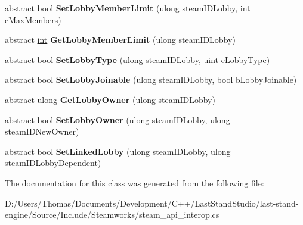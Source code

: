 \begin{DoxyCompactItemize}
\item 
\hypertarget{classValve_1_1Steamworks_1_1ISteamMatchmaking_a0256112144a894e1fb29af8934ae7090}{}abstract bool {\bfseries Set\+Lobby\+Member\+Limit} (ulong steam\+I\+D\+Lobby, \hyperlink{SDL__thread_8h_a6a64f9be4433e4de6e2f2f548cf3c08e}{int} c\+Max\+Members)\label{classValve_1_1Steamworks_1_1ISteamMatchmaking_a0256112144a894e1fb29af8934ae7090}

\item 
\hypertarget{classValve_1_1Steamworks_1_1ISteamMatchmaking_a49689e5ad1af7d6e264982d9c3dcb174}{}abstract \hyperlink{SDL__thread_8h_a6a64f9be4433e4de6e2f2f548cf3c08e}{int} {\bfseries Get\+Lobby\+Member\+Limit} (ulong steam\+I\+D\+Lobby)\label{classValve_1_1Steamworks_1_1ISteamMatchmaking_a49689e5ad1af7d6e264982d9c3dcb174}

\item 
\hypertarget{classValve_1_1Steamworks_1_1ISteamMatchmaking_ae58e3667786495a325785ffc48dbe408}{}abstract bool {\bfseries Set\+Lobby\+Type} (ulong steam\+I\+D\+Lobby, uint e\+Lobby\+Type)\label{classValve_1_1Steamworks_1_1ISteamMatchmaking_ae58e3667786495a325785ffc48dbe408}

\item 
\hypertarget{classValve_1_1Steamworks_1_1ISteamMatchmaking_acb3142f585be8ffe25fe264896e61864}{}abstract bool {\bfseries Set\+Lobby\+Joinable} (ulong steam\+I\+D\+Lobby, bool b\+Lobby\+Joinable)\label{classValve_1_1Steamworks_1_1ISteamMatchmaking_acb3142f585be8ffe25fe264896e61864}

\item 
\hypertarget{classValve_1_1Steamworks_1_1ISteamMatchmaking_ab180f538d1c2062a6e315d4b39d2ddb6}{}abstract ulong {\bfseries Get\+Lobby\+Owner} (ulong steam\+I\+D\+Lobby)\label{classValve_1_1Steamworks_1_1ISteamMatchmaking_ab180f538d1c2062a6e315d4b39d2ddb6}

\item 
\hypertarget{classValve_1_1Steamworks_1_1ISteamMatchmaking_a7bf3b87a95ee0b8493d88f4955d2df91}{}abstract bool {\bfseries Set\+Lobby\+Owner} (ulong steam\+I\+D\+Lobby, ulong steam\+I\+D\+New\+Owner)\label{classValve_1_1Steamworks_1_1ISteamMatchmaking_a7bf3b87a95ee0b8493d88f4955d2df91}

\item 
\hypertarget{classValve_1_1Steamworks_1_1ISteamMatchmaking_a2610b64c2285e656a044ee7ac0f6fb12}{}abstract bool {\bfseries Set\+Linked\+Lobby} (ulong steam\+I\+D\+Lobby, ulong steam\+I\+D\+Lobby\+Dependent)\label{classValve_1_1Steamworks_1_1ISteamMatchmaking_a2610b64c2285e656a044ee7ac0f6fb12}

\end{DoxyCompactItemize}


The documentation for this class was generated from the following file\+:\begin{DoxyCompactItemize}
\item 
D\+:/\+Users/\+Thomas/\+Documents/\+Development/\+C++/\+Last\+Stand\+Studio/last-\/stand-\/engine/\+Source/\+Include/\+Steamworks/steam\+\_\+api\+\_\+interop.\+cs\end{DoxyCompactItemize}

